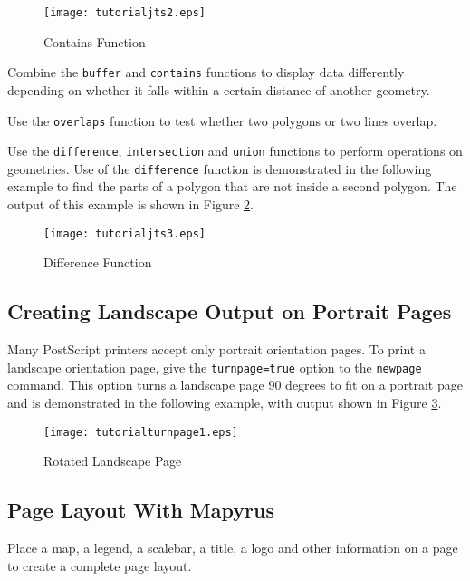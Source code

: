 

\begin{figure}[htb]
\texttt{[image: tutorialjts2.eps]}
\caption{Contains Function}
\label{tutorialjts2}
\end{figure}

Combine the \texttt{buffer} and \texttt{contains} functions to
display data differently depending on whether it falls within
a certain distance of another geometry.

Use the \texttt{overlaps} function to test whether two
polygons or two lines overlap.

Use the \texttt{difference}, \texttt{intersection} and \texttt{union}
functions to perform operations on geometries.
Use of the \texttt{difference} function is demonstrated in the
following example to find the parts of a polygon that are not inside a second
polygon.  The output of this example is shown in Figure \ref{tutorialjts3}.



\begin{figure}[htb]
\texttt{[image: tutorialjts3.eps]}
\caption{Difference Function}
\label{tutorialjts3}
\end{figure}

\subsection{Creating Landscape Output on Portrait Pages}

Many PostScript printers accept only portrait orientation pages.
To print a landscape orientation page, 
give the \texttt{turnpage=true} option to the \texttt{newpage} command.
This option turns a landscape page 90 degrees to fit on a portrait page
and is demonstrated in the following example,
with output shown in Figure \ref{tutorialturnpage1}.



\begin{figure}[htb]
\texttt{[image: tutorialturnpage1.eps]}
\caption{Rotated Landscape Page}
\label{tutorialturnpage1}
\end{figure}

\subsection{Page Layout With Mapyrus}

Place a map, a legend, a scalebar, a title, a logo and other information on
a page to create a complete page layout.

